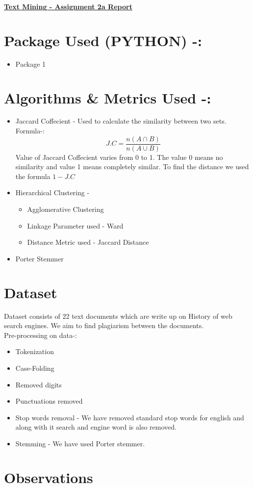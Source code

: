 \documentclass[a4paper]{article}
\begin{document}
\centerline{\textbf{\underline{\huge{Text Mining - Assignment 2a Report}}}}

\section{Package Used (PYTHON) -:}

\begin{itemize}
\item Package 1
\end{itemize}

\section{Algorithms \& Metrics Used -:}

\begin{itemize}
\item Jaccard Coffecient - Used to calculate the similarity between two sets. 
\\Formula-:
$$ J.C =  \frac {n(A \cap B)} {n(A \cup B)}  $$
Value of Jaccard Coffecient varies from 0 to 1. The value 0 means no similarity and value 1 means completely similar. To find the distance we used the formula $1 - J.C$

\item Hierarchical Clustering - 

\begin{itemize}
\item Agglomerative Clustering 
\item Linkage Parameter used - Ward
\item Distance Metric used -  Jaccard Distance
\end{itemize}

\item Porter Stemmer 

\end{itemize}

\section{Dataset}
Dataset consists of 22 text documents which are write up on History of web search engines. We aim to find plagiarism between the documents.
\\ Pre-processing on data-:
\begin{itemize}
\item Tokenization
\item Case-Folding
\item Removed digits
\item Punctuations removed
\item Stop words removal - We have removed standard stop words for english and along with it search and engine word is also removed.
\item Stemming - We have used Porter stemmer.
\end{itemize}

\section{Observations}
\end{document}
